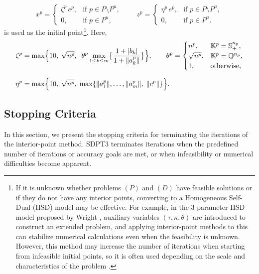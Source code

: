 \documentclass{scrartcl}
\begin{document}
\[
    x^p = \begin{cases}
        \zeta^p\, e^p, & \text{if } p \in P \setminus P^u,\\
        0, & \text{if } p\in P^u,
    \end{cases}
    \quad
    \quad 
    z^p = \begin{cases}
        \eta^p\, e^p, & \text{if } p \in P \setminus P^u,\\
        0, & \text{if } p\in P^u.
    \end{cases}
\]
is used as the initial point\footnote{If it is unknown whether problems $(P)$ and $(D)$ have feasible solutions or if they do not have any interior points, converting to a Homogeneous Self-Dual (HSD) model may be effective.
For example, in the 3-parameter HSD model proposed by Wright \cite{Wright1997},
auxiliary variables $(\tau, \kappa, \theta)$ are introduced to construct an extended problem, and applying interior-point methods to this can stabilize numerical calculations even when the feasibility is unknown.
However, this method may increase the number of iterations when starting from infeasible initial points, so it is often used depending on the scale and characteristics of the problem \cite{toh1999}.}. Here,
\begin{align*}
    \zeta^p 
    &= \max\Bigl\{
       10,\;\sqrt{n^p},\;\;\theta^p \max_{1 \le k \le m}\bigl\{\frac{1 + |b_k|}{1 + \|a^p_k\|}\bigr\}
      \Bigr\},
    \quad
    \quad
    \theta^p = \begin{cases}
        n^p, & \mathbb{K}^p=\mathbb{S}^{n_p}_+,\\
        \sqrt{n^p}, & \mathbb{K}^p=\mathbb{Q}^{n_p},\\
        1, & \text{otherwise},
    \end{cases}
    \\[6pt]
    \eta^p 
    &= \max\Bigl\{
       10,\;\sqrt{n^p},\;\max\{\|a^p_1\|,\ldots,\|a^p_m\|,\;\|c^p\|\}
      \Bigr\}.
\end{align*}

\medskip
\subsection{Stopping Criteria}
\label{sec:stopping_criteria}

In this section, we present the stopping criteria for terminating the iterations of the interior-point method.
SDPT3 terminates iterations when the predefined number of iterations or accuracy goals are met, or when infeasibility or numerical difficulties become apparent.
\end{document}
